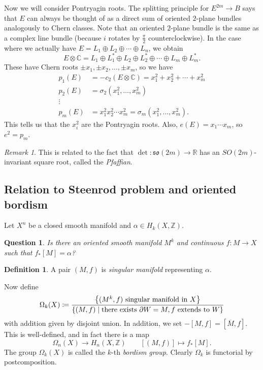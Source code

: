 \documentclass[leqno, openany]{memoir}
\newtheorem{quest}[thm]{Question}
\theoremstyle{definition}
\newtheorem{defn}[thm]{Definition}
\theoremstyle{remark}
\newtheorem{rmk}[thm]{Remark}
\theoremstyle{plain}
\theoremstyle{definition}
\theoremstyle{remark}
\newcommand{\R}{\mathbb{R}}
\newcommand{\C}{\mathbb{C}}
\newcommand{\Z}{\mathbb{Z}}
\newcommand{\mf}[1]{\mathfrak{#1}}
\newcommand{\ol}[1]{\overline{#1}}
\begin{document}
Now we will consider Pontryagin roots. The splitting principle for $E^{2m} \to
B$ says that $E$ can always be thought of as a direct sum of oriented $2$-plane
bundles analogously to Chern classes. Note that an oriented $2$-plane bundle is
the same as a complex line bundle (because $i$ rotates by $\frac{\pi}{2}$
counterclockwise). In the case where we actually have $E = L_1 \oplus L_2
\oplus \cdots \oplus L_n$, we obtain \[ E \otimes \C = L_1 \oplus L_1^* \oplus
L_2 \oplus L_2^* \oplus \cdots \oplus L_m \oplus L_m^*. \] These have Chern
roots $\pm x_1, \pm x_2, \ldots, \pm x_m$, so we have \begin{align*} p_1(E) &=
    -c_2(E \otimes \C) = x_1^2 + x_2^2 + \cdots + x_m^2 \\ p_2(E) &=
    \sigma_2(x_1^2, \ldots, x_m^2) \\ \vdots & \\ p_m(E) &= x_1^2 x_2^2 \cdots
x_m^2 = \sigma_m(x_1^2, \ldots, x_m^2).  \end{align*} This tells us that the
$x_i^2$ are the Pontryagin roots. Also, $e(E) = x_1 \cdots x_m$, so $e^2 =
p_m$.

\begin{rmk} This is related to the fact that $\det \colon \mf{so}(2m) \to \R$
has an $SO(2m)$-invariant square root, called the \textit{Pfaffian}.  \end{rmk}

\subsection{Relation to Steenrod problem and oriented bordism}%
\label{sub:relation_to_steenrod_problem_and_oriented_bordism}

Let $X^n$ be a closed smooth manifold and $\alpha \in H_k(X, \Z)$.
\begin{quest} Is there an oriented smooth manifold $M^k$ and continuous $f
\colon M \to X$ such that $f_*[M] = \alpha$?  \end{quest}

\begin{defn} A pair $(M, f)$ is \textit{singular manifold} representing
$\alpha$.  \end{defn}

Now define \[ \Omega_k(X) \coloneqq \frac{ \qty{(M^k, f)\ \text{singular
manifold in $X$}} }{\qty{(M, f) \mid \text{there exists }\partial W = M, f\
\text{extends to $W$}}} \] with addition given by disjoint union. In addition,
we set $-[M, f] = [\ol{M}, f]$. This is well-defined, and in fact there is a
map \[ \Omega_n(X) \to H_n(X, \Z) \qquad [(M, f)] \mapsto f_*[M]. \] The group
$\Omega_k(X)$ is called the $k$-th \textit{bordism group}. Clearly $\Omega_k$
is functorial by postcomposition.
\end{document}
